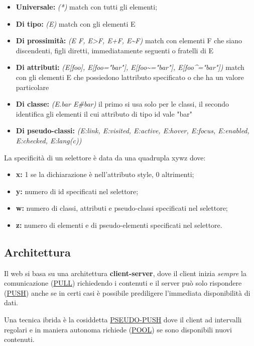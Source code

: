 \begin{itemize}
\item
  \textbf{Universale:} \emph{(*)} match con tutti gli elementi;
\item
  \textbf{Di tipo:} \emph{(E)} match con gli elementi E
\item
  \textbf{Di prossimità:} \emph{(E F, E\textgreater F, E+F,
  E\textasciitilde F)} match con elementi F che siano discendenti, figli
  diretti, immediatamente seguenti o fratelli di E
\item
  \textbf{Di attributi:} \emph{(E{[}foo{]}, E{[}foo="bar"{]},
  E{[}foo\textasciitilde="bar"{]}, E{[}foo\^{}="bar"{]})} match con gli
  elementi E che possiedono l\textquotesingle attributo specificato o
  che ha un valore particolare
\item
  \textbf{Di classe:} \emph{(E.bar E\#bar)} il primo si usa solo per le
  classi, il secondo identifica gli elementi il cui attributo di tipo id
  vale "bar"
\item
  \textbf{Di pseudo-classi:} \emph{(E:link, E:visited, E:active,
  E:hover, E:focus, E:enabled, E:checked, E:lang(c))}
\end{itemize}

La specificità di un selettore è data da una quadrupla xywz dove:

\begin{itemize}
\item
  \textbf{x:} 1 se la dichiarazione è nell'attributo style, 0
  altrimenti;
\item
  \textbf{y:} numero di id specificati nel selettore;
\item
  \textbf{w:} numero di classi, attributi e pseudo-classi specificati
  nel selettore;
\item
  \textbf{z:} numero di elementi e di pseudo-elementi specificati nel
  selettore.
\end{itemize}

\subsection{Architettura}\label{architettura}

Il web si basa su una architettura \textbf{client-server}, dove il
client inizia \emph{sempre} la comunicazione (\ul{PULL}) richiedendo i
contenuti e il server può solo rispondere (\ul{PUSH}) anche se in certi
casi è possibile prediligere l'immediata disponibilità di dati.

Una tecnica ibrida è la cosiddetta \ul{PSEUDO-PUSH} dove il client ad
intervalli regolari e in maniera autonoma richiede (\ul{POOL}) se sono
disponibili nuovi contenuti.

